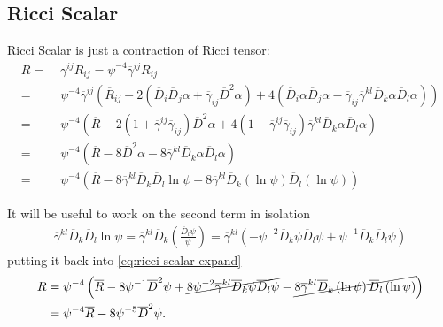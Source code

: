\documentclass[aps,prd,preprint]{revtex4-1}
\newcommand{\ogamma}{\overline{\gamma}}
\newcommand{\OD}{\overline{D}}
\begin{document}
\subsection{Ricci Scalar}

Ricci Scalar is just a contraction of Ricci tensor:
\begin{align}\label{eq:ricci-scalar-expand}
R = & \; \gamma^{ij} R_{ij} = \psi^{-4} \ogamma^{ij} R_{ij} \\
= & \; \psi^{-4} \ogamma^{ij} \left(
 \overline{R}_{ij} -2 \left( \OD_i \OD_j \alpha + \ogamma_{ij} \OD^2 \alpha \right) + 4 \left(
  \OD_i \alpha \OD_j \alpha - \ogamma_{ij} \ogamma^{kl} \OD_k \alpha \OD_l \alpha \right) \right) \\
= &\; \psi^{-4} \left( \overline{R} - 2 \left( 1 + \ogamma^{ij} \ogamma_{ij} \right) \OD^2 \alpha +
  4 \left(1 - \ogamma^{ij} \ogamma_{ij} \right) \ogamma^{kl} \OD_k \alpha \OD_l \alpha \right) \\
= &\; \psi^{-4} \left( \overline{R} - 8 \OD^2 \alpha - 8 \ogamma^{kl} \OD_k \alpha \OD_l \alpha \right) \\
= &\; \psi^{-4} \left( \overline{R} -
  8 \ogamma^{kl} \OD_k \OD_l \ln \psi - 8 \ogamma^{kl} \OD_k \left( \ln \psi \right) \OD_l \left( \ln \psi \right) \right)
\end{align}

It will be useful to work on the second term in isolation
\begin{align}
\ogamma^{kl} \OD_k \OD_l \ln \psi = \ogamma^{kl} \OD_k \left( \frac{\OD_l \psi}{\psi} \right) =
  \ogamma^{kl} \left( -\psi^{-2} \OD_k \psi \OD_l \psi + \psi^{-1} \OD_k \OD_l \psi \right)
\end{align}
putting it back into \eqref{eq:ricci-scalar-expand}
\begin{align}
R = & \; \psi^{-4} \left( \overline{R} - 8 \psi^{-1} \OD^2 \psi + \cancel{8 \psi^{-2} \ogamma^{kl} \OD_k \psi \OD_l \psi} -
  \cancel{8 \ogamma^{kl} \OD_k \left( \ln \psi \right) \OD_l \left( \ln \psi \right)} \right) \\
= & \; \psi^{-4} \overline{R } - 8 \psi^{-5} \OD^2 \psi.
\end{align}
\end{document}
